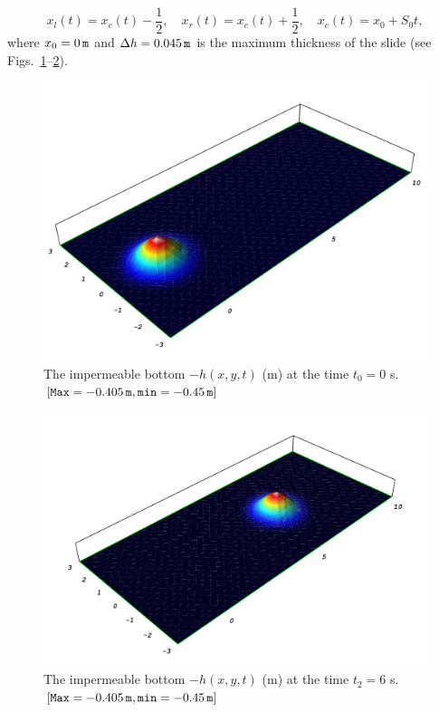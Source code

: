 \begin{equation}
  \label{eq:lopes:bottom4}
  x_l(t)=x_c(t)-\frac{1}{2},\quad
  x_r(t)=x_c(t)+\frac{1}{2},\quad x_c(t)=x_0+S_0t,
\end{equation}
where $x_0=0\, {\tt m}$ and $\Delta h=0.045\, {\tt
m}$ is the maximum thickness of the slide (see
Figs.~\ref{fig:lopes:objectbottom}--\ref{fig:lopes:objectbottom2}).

\begin{figure}
\bwfig
  \centering
  \includegraphics[width=\largefig]{chapters/lopes/pdf/depth0.pdf}
  \caption{The impermeable bottom $-h(x,y,t)$ (m) at the time $t_0=0$
    s. $[{\tt Max}= -0.405\, {\tt m}, {\tt min}=-0.45\,{\tt m}]$}
  \label{fig:lopes:objectbottom}
\vspace*{-6pt}
\end{figure}

\begin{figure}
\bwfig
  \centering
  \includegraphics[width=\largefig]{chapters/lopes/pdf/depth6.pdf}
  \caption{The impermeable bottom $-h(x,y,t)$ (m) at the time $t_2=6$
    s. $[{\tt Max}= -0.405\, {\tt m}, {\tt min}=-0.45\,{\tt m}]$}
  \label{fig:lopes:objectbottom2}
\vspace*{-6pt}
\end{figure}

